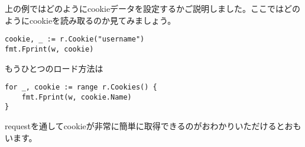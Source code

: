 上の例ではどのようにcookieデータを設定するかご説明しました。ここではどのようにcookieを読み取るのか見てみましょう。

\begin{lstlisting}[numbers=none]
cookie, _ := r.Cookie("username")
fmt.Fprint(w, cookie)
\end{lstlisting}

もうひとつのロード方法は

\begin{lstlisting}[numbers=none]
for _, cookie := range r.Cookies() {
    fmt.Fprint(w, cookie.Name)
}
\end{lstlisting}

requestを通してcookieが非常に簡単に取得できるのがおわかりいただけるとおもいます。
